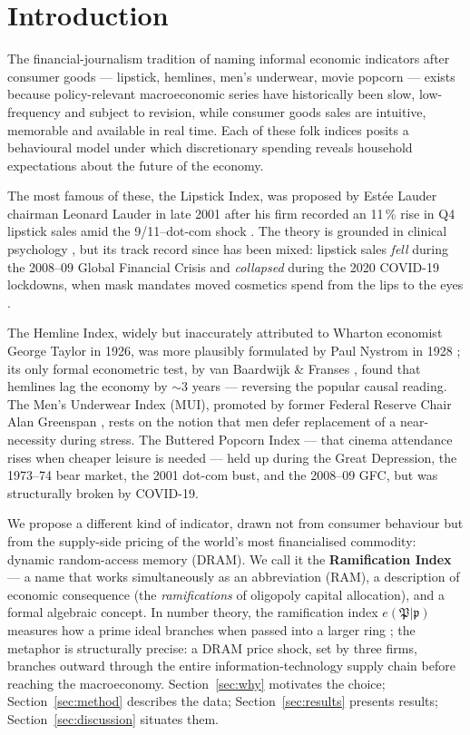 \documentclass[11pt,a4paper]{article}
\begin{document}
\section{Introduction}\label{sec:intro}

The financial-journalism tradition of naming informal economic indicators after consumer goods --- lipstick, hemlines, men's underwear, movie popcorn --- exists because policy-relevant macroeconomic series have historically been slow, low-frequency and subject to revision, while consumer goods sales are intuitive, memorable and available in real time. Each of these folk indices posits a behavioural model under which discretionary spending reveals household expectations about the future of the economy.

The most famous of these, the Lipstick Index, was proposed by Est\'ee Lauder chairman Leonard Lauder in late 2001 after his firm recorded an 11\,\% rise in Q4 lipstick sales amid the 9/11--dot-com shock \citep{nelson2001}. The theory is grounded in clinical psychology \citep{hill2012}, but its track record since has been mixed: lipstick sales \emph{fell} during the 2008--09 Global Financial Crisis and \emph{collapsed} during the 2020 COVID-19 lockdowns, when mask mandates moved cosmetics spend from the lips to the eyes \citep{scott2020,bryan2022}.

The Hemline Index, widely but inaccurately attributed to Wharton economist George Taylor in 1926, was more plausibly formulated by Paul Nystrom in 1928 \citep{nystrom1928}; its only formal econometric test, by van Baardwijk \& Franses \citep{baardwijk2010}, found that hemlines lag the economy by $\sim$3 years --- reversing the popular causal reading. The Men's Underwear Index (MUI), promoted by former Federal Reserve Chair Alan Greenspan \citep{greenspan2007,krulwich2008}, rests on the notion that men defer replacement of a near-necessity during stress. The Buttered Popcorn Index --- that cinema attendance rises when cheaper leisure is needed --- held up during the Great Depression, the 1973--74 bear market, the 2001 dot-com bust, and the 2008--09 GFC, but was structurally broken by COVID-19.

We propose a different kind of indicator, drawn not from consumer behaviour but from the supply-side pricing of the world's most financialised commodity: dynamic random-access memory (DRAM). We call it the \textbf{Ramification Index} --- a name that works simultaneously as an abbreviation (RAM), a description of economic consequence (the \emph{ramifications} of oligopoly capital allocation), and a formal algebraic concept. In number theory, the ramification index $e(\mathfrak{P}|\mathfrak{p})$ measures how a prime ideal branches when passed into a larger ring \citep{neukirch1999}; the metaphor is structurally precise: a DRAM price shock, set by three firms, branches outward through the entire information-technology supply chain before reaching the macroeconomy. Section~\ref{sec:why} motivates the choice; Section~\ref{sec:method} describes the data; Section~\ref{sec:results} presents results; Section~\ref{sec:discussion} situates them.
\end{document}
